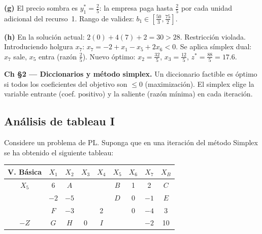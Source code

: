 \documentclass[12pt]{article}
\theoremstyle{plain}
\begin{document}
\begin{solucion}
\noindent\textbf{(g)} El precio sombra es $y_1^*=\tfrac{2}{5}$: la empresa paga hasta $\tfrac{2}{5}$ por cada unidad adicional del recurso~1. Rango de validez: $b_1\in[\tfrac{50}{3},\tfrac{75}{2}]$.

\noindent\textbf{(h)} En la solución actual: $2(0)+4(7)+2=30>28$. Restricción violada. Introduciendo holgura $x_7$: $x_7=-2+x_1-x_5+2x_6<0$. Se aplica símplex dual: $x_7$ sale, $x_5$ entra (razón $\tfrac{2}{5}$). Nuevo óptimo: $x_2=\tfrac{32}{5}$, $x_3=\tfrac{12}{5}$, $z^*=\tfrac{88}{5}=17.6$.

\end{solucion}

\begin{teofund}
\textbf{Ch §2 — Diccionarios y método simplex.} Un diccionario factible es óptimo si todos los coeficientes del objetivo son $\leq 0$ (maximización). El simplex elige la variable entrante (coef. positivo) y la saliente (razón mínima) en cada iteración.
\end{teofund}

\bigskip

\subsection{Análisis de tableau I}

Considere un problema de PL. Suponga que en una iteración del método Simplex se ha
obtenido el siguiente tableau:

\begin{center}
      \begin{tabular}{c|ccccccc|c}
            V. Básica & $X_1$ & $X_2$ & $X_3$ & $X_4$ & $X_5$ & $X_6$ & $X_7$ & $X_B$ \\
            \hline
            $X_5$     & 6     & $A$   &       &       & $B$   & 1     & 2     & $C$   \\
                      & $-2$  & $-5$  &       &       & $D$   & 0     & $-1$  & $E$   \\
                      & $F$   & $-3$  &       & 2     &       & 0     & $-4$  & 3     \\
            $-Z$      & $G$   & $H$   & 0     & $I$   &       &       & $-2$  & 10    \\
      \end{tabular}
\end{center}
\end{document}
